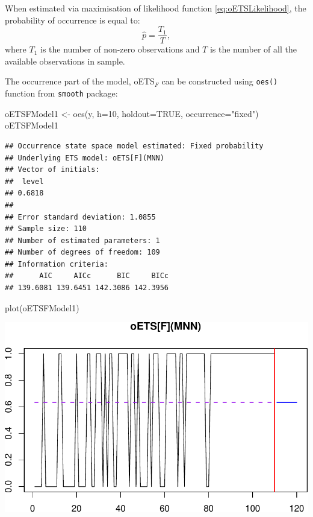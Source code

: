 \documentclass[
]{book}
\newenvironment{Shaded}{\begin{snugshade}}{\end{snugshade}}
\newcommand{\AttributeTok}[1]{\textcolor[rgb]{0.77,0.63,0.00}{#1}}
\newcommand{\ConstantTok}[1]{\textcolor[rgb]{0.00,0.00,0.00}{#1}}
\newcommand{\DecValTok}[1]{\textcolor[rgb]{0.00,0.00,0.81}{#1}}
\newcommand{\FunctionTok}[1]{\textcolor[rgb]{0.00,0.00,0.00}{#1}}
\newcommand{\NormalTok}[1]{#1}
\newcommand{\OtherTok}[1]{\textcolor[rgb]{0.56,0.35,0.01}{#1}}
\newcommand{\StringTok}[1]{\textcolor[rgb]{0.31,0.60,0.02}{#1}}
\theoremstyle{definition}
\theoremstyle{definition}
\theoremstyle{definition}
\theoremstyle{definition}
\theoremstyle{remark}
\begin{document}
When estimated via maximisation of likelihood function \eqref{eq:oETSLikelihood}, the probability of occurrence is equal to:
\begin{equation}
    \hat{p} = \frac{T_1}{T},
    \label{eq:oETSFixedProbabilityMLE}
\end{equation}
where \(T_1\) is the number of non-zero observations and \(T\) is the number of all the available observations in sample.

The occurrence part of the model, oETS\(_F\) can be constructed using \texttt{oes()} function from \texttt{smooth} package:

\begin{Shaded}
\begin{Highlighting}[]
\NormalTok{oETSFModel1 }\OtherTok{\textless{}{-}} \FunctionTok{oes}\NormalTok{(y, }\AttributeTok{h=}\DecValTok{10}\NormalTok{, }\AttributeTok{holdout=}\ConstantTok{TRUE}\NormalTok{,}
                   \AttributeTok{occurrence=}\StringTok{"fixed"}\NormalTok{)}
\NormalTok{oETSFModel1}
\end{Highlighting}
\end{Shaded}

\begin{verbatim}
## Occurrence state space model estimated: Fixed probability
## Underlying ETS model: oETS[F](MNN)
## Vector of initials:
##  level 
## 0.6818 
## 
## Error standard deviation: 1.0855
## Sample size: 110
## Number of estimated parameters: 1
## Number of degrees of freedom: 109
## Information criteria: 
##      AIC     AICc      BIC     BICc 
## 139.6081 139.6451 142.3086 142.3956
\end{verbatim}

\begin{Shaded}
\begin{Highlighting}[]
\FunctionTok{plot}\NormalTok{(oETSFModel1)}
\end{Highlighting}
\end{Shaded}

\includegraphics{adam_files/figure-latex/oETSFExample1-1.pdf}
\end{document}
